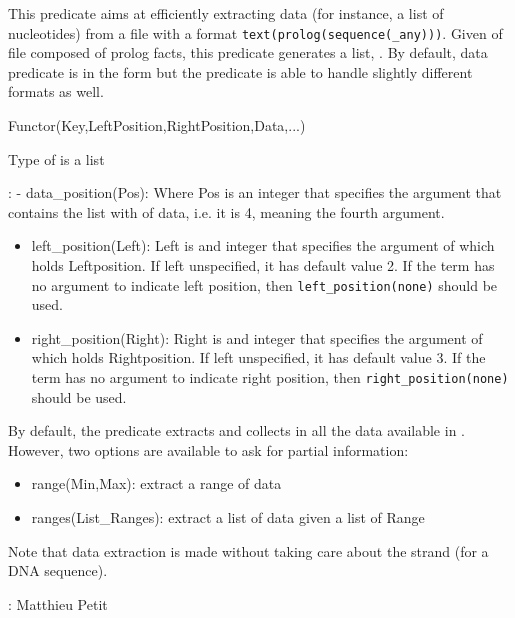 \begin{description}
This predicate aims at efficiently extracting data (for instance, a list of nucleotides) from a file
with a format \verb$text(prolog(sequence(_any)))$.
Given of file composed of prolog facts, this predicate generates a list, .
By default, data predicate is in the form but the predicate is able to handle
slightly different formats as well.

\begin{code}
Functor(Key,LeftPosition,RightPosition,Data,...)
\end{code}

Type of  is a list

: - data_position(Pos): Where Pos is an integer that specifies the argument that contains the list with of data, i.e. it is 4, meaning the fourth argument.

\begin{itemize}
    \item left_position(Left): Left is and integer that specifies the argument of which holds Leftposition. If left unspecified, it has default value 2. If the term has no argument to indicate left position, then \verb$left_position(none)$ should be used.
    \item right_position(Right): Right is and integer that specifies the argument of which holds Rightposition. If left unspecified, it has default value 3. If the term has no argument to indicate right position, then \verb$right_position(none)$ should be used.
\end{itemize}

By default, the predicate extracts and collects in  all the data available in .
However, two options are available to ask for partial information:

\begin{itemize}
    \item range(Min,Max): extract a range of data
    \item ranges(List_Ranges): extract a list of data given a list of Range
\end{itemize}

Note that data extraction is made without taking care about the strand (for a DNA sequence).

\begin{tags}
: Matthieu Petit
\end{tags}


\end{description}
